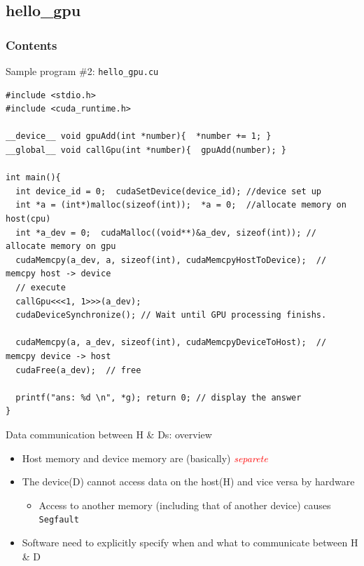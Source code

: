 \documentclass[dvipdfmx, 11pt, aspectratio=169]{beamer}   %
\begin{document}
\subsection{hello\_gpu}
\begin{frame}
    \frametitle{Contents}
    \linespread{0.6}\selectfont
\end{frame}
\begin{frame}[fragile]{Sample program \#2: \texttt{hello\_gpu.cu}}
\begin{block}{}\vspace{-\baselineskip}
  \begin{lstlisting}[language=CUDA, basicstyle=\ttfamily\tiny]
#include <stdio.h>
#include <cuda_runtime.h>

__device__ void gpuAdd(int *number){  *number += 1; }
__global__ void callGpu(int *number){  gpuAdd(number); }

int main(){
  int device_id = 0;  cudaSetDevice(device_id); //device set up
  int *a = (int*)malloc(sizeof(int));  *a = 0;  //allocate memory on host(cpu)
  int *a_dev = 0;  cudaMalloc((void**)&a_dev, sizeof(int)); // allocate memory on gpu
  cudaMemcpy(a_dev, a, sizeof(int), cudaMemcpyHostToDevice);  // memcpy host -> device
  // execute
  callGpu<<<1, 1>>>(a_dev);
  cudaDeviceSynchronize(); // Wait until GPU processing finishs.
  
  cudaMemcpy(a, a_dev, sizeof(int), cudaMemcpyDeviceToHost);  // memcpy device -> host 
  cudaFree(a_dev);  // free

  printf("ans: %d \n", *g); return 0; // display the answer
}
\end{lstlisting}
\end{block}
\end{frame}
\begin{frame}{Data communication between H \& Ds: overview}
  \begin{itemize}
    \item Host memory and device memory are (basically) \textcolor{red}{\textit{separete}}
    \item The device(D) cannot access data on the host(H) and vice versa by hardware
    \begin{itemize}
      \item Access to another memory (including that of another device) causes \lstinline|Segfault|
    \end{itemize}
    \item Software need to explicitly specify when and what to communicate between H \& D
  \end{itemize}
\end{frame}
\end{document}
